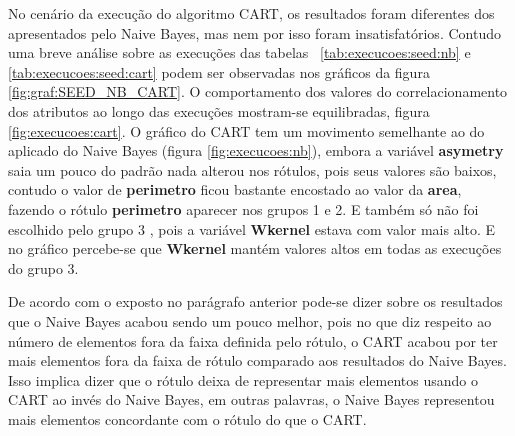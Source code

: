 No cenário da execução do algoritmo CART, os resultados foram diferentes dos  apresentados pelo Naive Bayes, mas nem por isso foram insatisfatórios. Contudo uma breve análise sobre as execuções das tabelas ~\ref{tab:execucoes:seed:nb} e \ref{tab:execucoes:seed:cart} podem ser observadas nos gráficos da figura  \ref{fig:graf:SEED_NB_CART}. O comportamento dos valores do correlacionamento dos atributos ao longo das execuções mostram-se equilibradas, figura \ref{fig:execucoes:cart}. O gráfico do CART tem um movimento semelhante ao do aplicado do Naive Bayes (figura \ref{fig:execucoes:nb}), embora a variável \textbf{asymetry} saia um pouco do padrão nada alterou nos rótulos, pois seus valores são baixos, contudo  o valor de \textbf{perimetro} ficou bastante encostado ao valor da \textbf{area}, fazendo o rótulo \textbf{perimetro} aparecer nos grupos 1 e 2. E também só não foi escolhido pelo grupo 3 , pois  a variável \textbf{Wkernel} estava com valor mais alto. E no gráfico percebe-se que  \textbf{Wkernel} mantém valores altos em todas as execuções do grupo 3.

De acordo com o exposto no parágrafo anterior pode-se dizer sobre os resultados que o Naive Bayes acabou sendo um pouco melhor, pois no que diz respeito ao número de elementos fora da faixa definida pelo rótulo, o CART acabou por ter mais elementos fora da faixa de rótulo comparado aos resultados do Naive Bayes. Isso implica dizer que o rótulo deixa de representar mais elementos usando o CART ao invés do Naive Bayes, em outras palavras, o Naive Bayes representou mais elementos concordante com o rótulo do que o CART.


